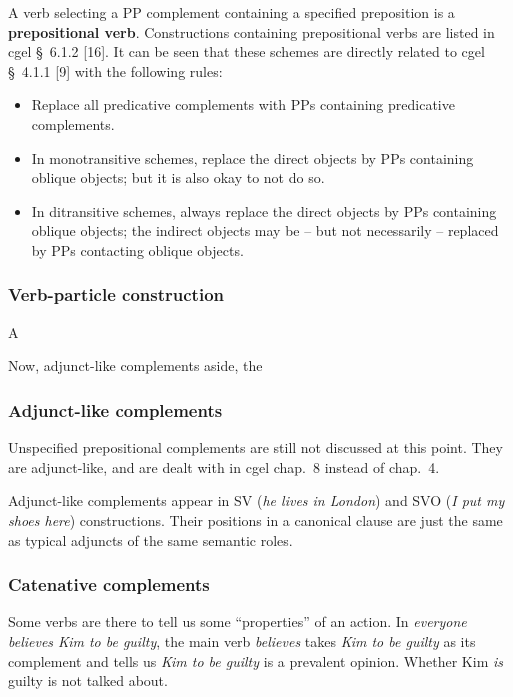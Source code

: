 \documentclass{article}
\newcommand*{\citesec}[1]{\S~{#1}}
\newcommand*{\citechap}[1]{chap.~{#1}}
\newcommand*{\concept}[1]{\textbf{#1}}
\newcommand*{\corpus}[1]{\emph{#1}}
\begin{document}
A verb selecting a PP complement containing a specified preposition is a \concept{prepositional verb}.
Constructions containing prepositional verbs are listed in \ac{cgel} \citesec{6.1.2} [16].
It can be seen that these schemes are directly related to \ac{cgel} \citesec{4.1.1} [9]
with the following rules:
\begin{itemize}
    \item Replace all predicative complements with PPs containing predicative complements.
    \item In monotransitive schemes, replace the direct objects by PPs containing oblique objects; 
    but it is also okay to not do so.
    \item In ditransitive schemes, always replace the direct objects by PPs containing oblique objects;
    the indirect objects may be -- but not necessarily -- replaced by PPs contacting oblique objects.
\end{itemize}

\subsubsection{Verb-particle construction}

A 

Now, adjunct-like complements aside, 
the 

\subsubsection{Adjunct-like complements}

Unspecified prepositional complements are still not discussed at this point.
They are adjunct-like, and are dealt with in \ac{cgel} \citechap{8} instead of \citechap{4}.

Adjunct-like complements appear in SV (\corpus{he lives in London}) and 
SVO (\corpus{I put my shoes here}) constructions. %
Their positions in a canonical clause are just the same as typical adjuncts of the same semantic roles.

\subsubsection{Catenative complements}

Some verbs are there to tell us some ``properties'' of an action.
In \corpus{everyone believes Kim to be guilty},
the main verb \corpus{believes} takes \corpus{Kim to be guilty} as its complement
and tells us \corpus{Kim to be guilty} is a prevalent opinion.
Whether Kim \emph{is} guilty is not talked about.
\end{document}
